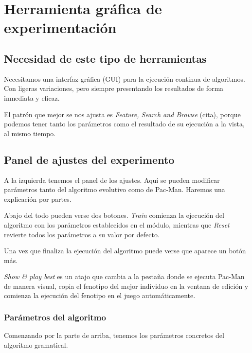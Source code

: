 \chapter{Herramienta gráfica de experimentación}

\section{Necesidad de este tipo de herramientas}
Necesitamos una interfaz gráfica (GUI) para la ejecución continua de algoritmos. Con ligeras variaciones, pero siempre presentando los resultados de forma inmediata y eficaz.

El patrón que mejor se nos ajusta es \textit{Feature, Search and Browse} (cita), porque podemos tener tanto los parámetros como el resultado de su ejecución a la vista, al mismo tiempo.

\section{Panel de ajustes del experimento}
A la izquierda tenemos el panel de los ajustes. Aquí se pueden modificar parámetros tanto del algoritmo evolutivo como de Pac-Man. Haremos una explicación por partes.
 
Abajo del todo pueden verse dos botones. \textit{Train} comienza la ejecución del algoritmo con los parámetros establecidos en el módulo, mientras que \textit{Reset} revierte todos los parámetros a su valor por defecto.


Una vez que finaliza la ejecución del algoritmo puede verse que aparece un botón más.


\textit{Show \& play best} es un atajo que cambia a la pestaña donde se ejecuta Pac-Man de manera visual, copia el fenotipo del mejor individuo en la ventana de edición y comienza la ejecución del fenotipo en el juego automáticamente.

\subsection{Parámetros del algoritmo}
Comenzando por la parte de arriba, tenemos los parámetros concretos del algoritmo gramatical.


